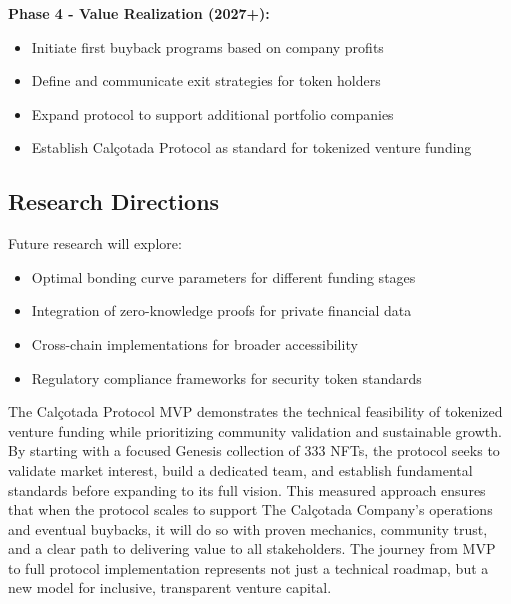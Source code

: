 \documentclass[conference]{IEEEtran}
\begin{document}
\textbf{Phase 4 - Value Realization (2027+):}
\begin{itemize}
    \item Initiate first buyback programs based on company profits
    \item Define and communicate exit strategies for token holders
    \item Expand protocol to support additional portfolio companies
    \item Establish Calçotada Protocol as standard for tokenized venture funding
\end{itemize}

\subsection{Research Directions}

Future research will explore:
\begin{itemize}
    \item Optimal bonding curve parameters for different funding stages
    \item Integration of zero-knowledge proofs for private financial data
    \item Cross-chain implementations for broader accessibility
    \item Regulatory compliance frameworks for security token standards
\end{itemize}

The Calçotada Protocol MVP demonstrates the technical feasibility of tokenized venture funding while prioritizing community validation and sustainable growth. By starting with a focused Genesis collection of 333 NFTs, the protocol seeks to validate market interest, build a dedicated team, and establish fundamental standards before expanding to its full vision. This measured approach ensures that when the protocol scales to support The Calçotada Company's operations and eventual buybacks, it will do so with proven mechanics, community trust, and a clear path to delivering value to all stakeholders. The journey from MVP to full protocol implementation represents not just a technical roadmap, but a new model for inclusive, transparent venture capital.



\end{document}

